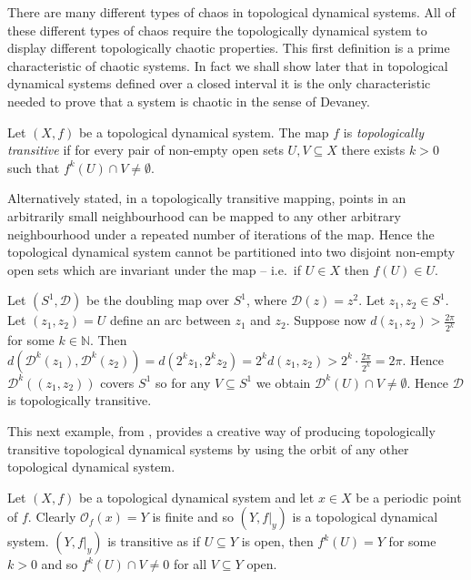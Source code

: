 There are many different types of chaos in topological dynamical systems. All of these different types of chaos require the topologically dynamical system to display different topologically chaotic properties.
This first definition is a prime characteristic of chaotic systems. In fact we shall show later that in topological dynamical systems defined over a closed interval it is the only characteristic needed to prove that a system is chaotic in the sense of Devaney.

\begin{defn} \label{defn:topological-transitivity}
    Let $(X, f)$ be a topological dynamical system. The map $f$ is \emph{topologically transitive} if for every pair of non-empty open sets $U, V \subseteq X$ there exists $k > 0$ such that $f^k(U) \cap V \neq \emptyset$.
\end{defn}

Alternatively stated, in a topologically transitive mapping, points in an arbitrarily small neighbourhood can be mapped to any other arbitrary neighbourhood under a repeated number of iterations of the map. Hence the topological dynamical system cannot be partitioned into two disjoint non-empty open sets which are invariant under the map -- i.e.\ if $U \in X$ then $f(U) \in U$.

\begin{exmp}
    Let $(S^1, \mathcal{D})$ be the doubling map over $S^1$, where $\mathcal{D}(z) = z^2$. Let $z_1, z_2 \in S^1$. Let $(z_1, z_2) = U$ define an arc between $z_1$ and $z_2$. Suppose now $d\left(z_1, z_2\right) > \frac{2\pi}{2^k}$ for some $k \in \mathbb{N}$. Then $d\left(\mathcal{D}^k(z_1), \mathcal{D}^k(z_2)\right) = d\left( 2^k z_1, 2^k z_2 \right) = 2^k d\left( z_1, z_2 \right) > 2^k \cdot \frac{2\pi}{2^k} = 2\pi$. Hence $\mathcal{D}^k((z_1, z_2))$ covers $S^1$ so for any $V \subseteq S^1$ we obtain $\mathcal{D}^k(U) \cap V \neq \emptyset$. Hence $\mathcal{D}$ is topologically transitive.
\end{exmp}

This next example, from \cite{kolyada-snoha}, provides a creative way of producing topologically transitive topological dynamical systems by using the orbit of any other topological dynamical system.

\begin{exmp}
    Let $(X, f)$ be a topological dynamical system and let $x \in X$ be a periodic point of $f$. Clearly $\mathcal{O}_f(x) = Y$ is finite and so $(Y, f|_y)$ is a topological dynamical system. $(Y, f|_y)$ is transitive as if $U \subseteq Y$ is open, then $f^k(U) = Y$ for some $k > 0$ and so $f^k(U) \cap V \neq 0$ for all $V \subseteq Y$ open.
\end{exmp}


